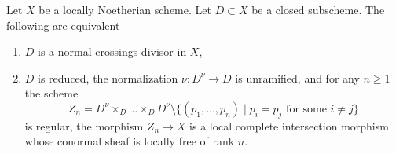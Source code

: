 %
\begin{lemma}
\label{lemma-characterize-normal-crossings-normalization}
Let $X$ be a locally Noetherian scheme. Let $D \subset X$ be a closed
subscheme. The following are equivalent
\begin{enumerate}
\item $D$ is a normal crossings divisor in $X$,
\item $D$ is reduced, the normalization $\nu : D^\nu \to D$ is unramified,
and for any $n \geq 1$ the scheme
$$
Z_n = D^\nu \times_D \ldots \times_D D^\nu
\setminus \{(p_1, \ldots, p_n) \mid p_i = p_j\text{ for some }i\not = j\}
$$
is regular, the morphism $Z_n \to X$ is a local complete intersection
morphism whose conormal sheaf is locally free of rank $n$.
\end{enumerate}
\end{lemma}

